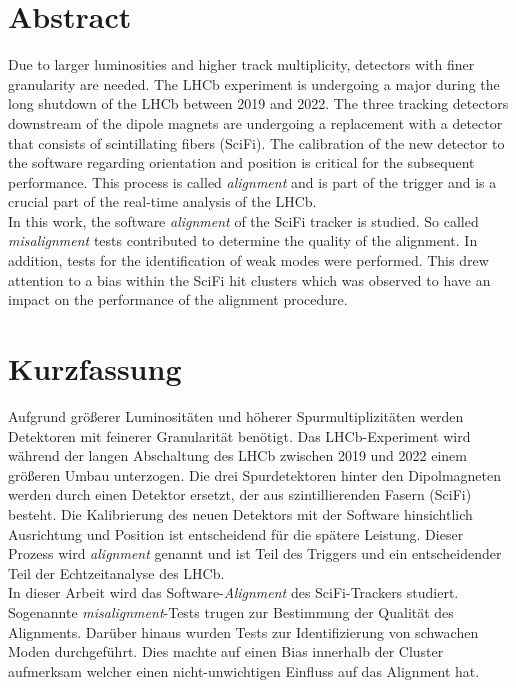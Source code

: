 \chapter*{Abstract}
\label{sec:abstract}

Due to larger luminosities and higher track multiplicity, detectors with finer granularity are needed.
The LHCb experiment is undergoing a major during the long shutdown of the LHCb between 2019 and 2022. The three tracking detectors downstream of the dipole magnets are undergoing a replacement with a detector that consists of scintillating fibers (SciFi).
The calibration of the new detector to the software regarding
orientation and position is critical for the subsequent performance. This
process is called \textit{alignment} and is part of the trigger and is a crucial part of the real-time analysis of the LHCb.
\\
In this work, the software \textit{alignment} of the SciFi tracker is studied.
So called \textit{misalignment} tests contributed to determine the quality
of the alignment. In addition, tests for the identification of weak modes were performed.
This drew attention to a bias within the SciFi hit clusters which was observed to have an impact on the performance of the alignment procedure.


\chapter*{Kurzfassung}
\label{sec:kurzf}

Aufgrund größerer Luminositäten und höherer Spurmultiplizitäten werden Detektoren mit feinerer Granularität benötigt.
Das LHCb-Experiment wird während der langen Abschaltung des LHCb zwischen 2019 und 2022 einem größeren Umbau unterzogen. Die drei Spurdetektoren hinter den Dipolmagneten werden durch einen Detektor ersetzt, der aus szintillierenden Fasern (SciFi) besteht.
Die Kalibrierung des neuen Detektors mit der Software hinsichtlich
Ausrichtung und Position ist entscheidend für die spätere Leistung. Dieser
Prozess wird \textit{alignment} genannt und ist Teil des Triggers und ein entscheidender Teil der Echtzeitanalyse des LHCb.
\\
In dieser Arbeit wird das Software-\textit{Alignment} des SciFi-Trackers studiert.
Sogenannte \textit{misalignment}-Tests trugen zur Bestimmung der Qualität
des Alignments. Darüber hinaus wurden Tests zur Identifizierung von schwachen Moden durchgeführt.
Dies machte auf einen Bias innerhalb der Cluster aufmerksam welcher einen
nicht-unwichtigen Einfluss auf das Alignment hat.
